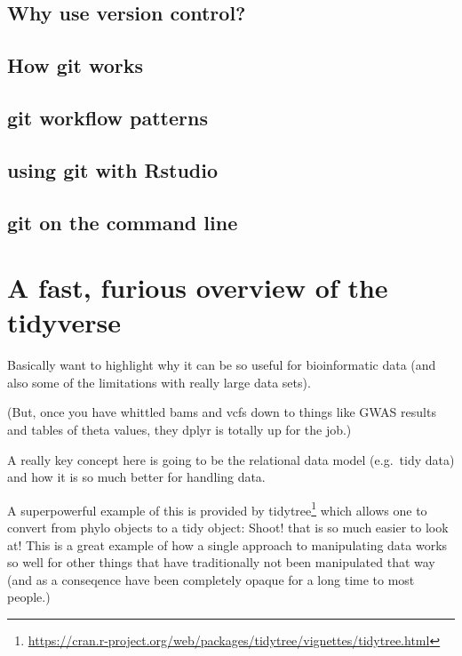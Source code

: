 \documentclass[]{krantz}
\renewcommand{\href}[2]{#2\footnote{\url{#1}}}
\begin{document}
\hypertarget{why-use-version-control}{%
\section{Why use version control?}\label{why-use-version-control}}

\hypertarget{git-workings}{%
\section{How git works}\label{git-workings}}

\hypertarget{git-workflow-patterns}{%
\section{git workflow patterns}\label{git-workflow-patterns}}

\hypertarget{using-git-with-rstudio}{%
\section{using git with Rstudio}\label{using-git-with-rstudio}}

\hypertarget{git-on-the-command-line}{%
\section{git on the command line}\label{git-on-the-command-line}}

\hypertarget{a-fast-furious-overview-of-the-tidyverse}{%
\chapter{A fast, furious overview of the tidyverse}\label{a-fast-furious-overview-of-the-tidyverse}}

Basically want to highlight why it can be so useful for bioinformatic
data (and also some of the limitations with really large data sets).

(But, once you have whittled bams and vcfs down to things like GWAS results
and tables of theta values, they dplyr is totally up for the job.)

A really key concept here is going to be the relational data model
(e.g.~tidy data) and how it is so much better for handling data.

A superpowerful example of this is provided by \href{https://cran.r-project.org/web/packages/tidytree/vignettes/tidytree.html}{tidytree}
which allows one to convert from phylo objects to a tidy object: Shoot! that
is so much easier to look at! This is a great example of how a single approach
to manipulating data works so well for other things that have traditionally not been
manipulated that way (and as a conseqence have been completely opaque for
a long time to most people.)
\end{document}
